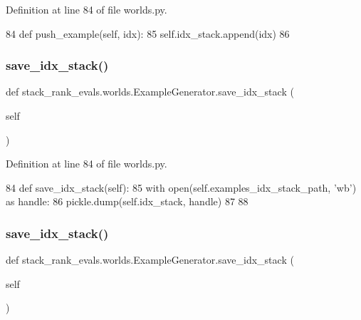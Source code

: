 Definition at line 84 of file worlds.\+py.


\begin{DoxyCode}
84     \textcolor{keyword}{def }push\_example(self, idx):
85         self.idx\_stack.append(idx)
86 
\end{DoxyCode}
\mbox{\label{classstack__rank__evals_1_1worlds_1_1ExampleGenerator_a47a988958641b4906b2d374938974cca}} 
\subsubsection{\texorpdfstring{save\+\_\+idx\+\_\+stack()}{save\_idx\_stack()}\hspace{0.1cm}{\footnotesize\ttfamily [1/2]}}
{\footnotesize\ttfamily def stack\+\_\+rank\+\_\+evals.\+worlds.\+Example\+Generator.\+save\+\_\+idx\+\_\+stack (\begin{DoxyParamCaption}\item[{}]{self }\end{DoxyParamCaption})}



Definition at line 84 of file worlds.\+py.


\begin{DoxyCode}
84     \textcolor{keyword}{def }save\_idx\_stack(self):
85         with open(self.examples\_idx\_stack\_path, \textcolor{stringliteral}{'wb'}) \textcolor{keyword}{as} handle:
86             pickle.dump(self.idx\_stack, handle)
87 
88 
\end{DoxyCode}
\mbox{\label{classstack__rank__evals_1_1worlds_1_1ExampleGenerator_a47a988958641b4906b2d374938974cca}} 
\subsubsection{\texorpdfstring{save\+\_\+idx\+\_\+stack()}{save\_idx\_stack()}\hspace{0.1cm}{\footnotesize\ttfamily [2/2]}}
{\footnotesize\ttfamily def stack\+\_\+rank\+\_\+evals.\+worlds.\+Example\+Generator.\+save\+\_\+idx\+\_\+stack (\begin{DoxyParamCaption}\item[{}]{self }\end{DoxyParamCaption})}



